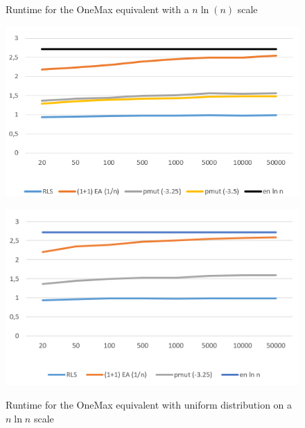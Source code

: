 \begin{figure}[h]
      \centering
      \begin{minipage}[b]{0.45\textwidth}
            \caption{Runtime for the OneMax equivalent with a $n\ln(n)$ scale}
            \includegraphics[width=\textwidth]{figures/images/oneMaxMultipleN.png}\label{fig:onemaxNlogNBound}
      \end{minipage}
      \hspace{0.75cm}
      \begin{minipage}[b]{0.45\textwidth}
            \caption{Runtime for the OneMax equivalent with uniform distribution on a $n\ln n$ scale}
            \includegraphics[width=\textwidth]{figures/images/oneMaxUniformMultipleN.png}\label{fig:onemaxUniformNlogNBound}
      \end{minipage}
\end{figure}

